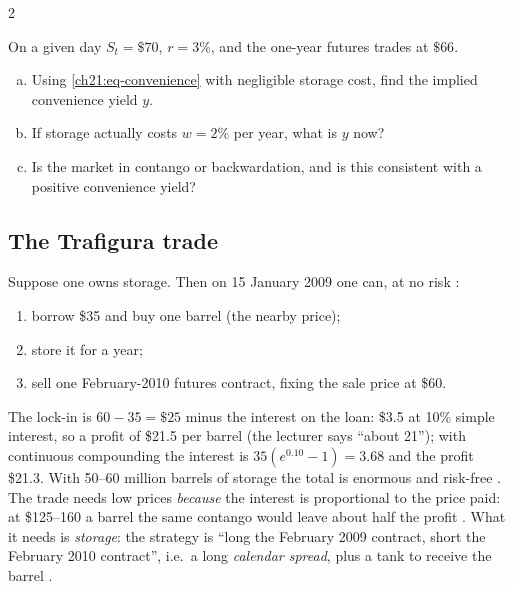 \begin{paracol}{2}
\begin{exercise}\label{ch21:ex-impliedyield}
On a given day $S_t=\$70$, $r=3\%$, and the one-year futures trades at $\$66$.
\begin{enumerate}[(a)]
  \item Using \eqref{ch21:eq-convenience} with negligible storage cost, find the implied convenience
      yield $y$.
  \item If storage actually costs $w=2\%$ per year, what is $y$ now?
  \item Is the market in contango or backwardation, and is this consistent with a positive convenience
      yield?
\end{enumerate}
\end{exercise}

\subsection{The Trafigura trade}
Suppose one owns storage. Then on 15 January 2009 one can, at no risk :
\begin{enumerate}[1.]
  \item borrow \$35 and buy one barrel (the nearby price);
  \item store it for a year;
  \item sell one February-2010 futures contract, fixing the sale price at \$60.
\end{enumerate}
The lock-in is $60-35=\$25$ minus the interest on the loan: \$3.5 at 10\% simple interest, so a profit of \$21.5 per barrel (the lecturer says ``about 21''); with continuous compounding the
interest is $35(e^{0.10}-1)=3.68$ and the profit \$21.3. With 50--60 million barrels of storage the total is enormous and risk-free . The trade needs
low prices \emph{because} the interest is proportional to the price paid: at \$125--160 a barrel the same contango would leave about half the profit . What it needs
is \emph{storage}: the strategy is ``long the February 2009 contract, short the February 2010 contract'', i.e.\ a long \emph{calendar spread}, plus a tank to receive the
barrel .


\end{paracol}
